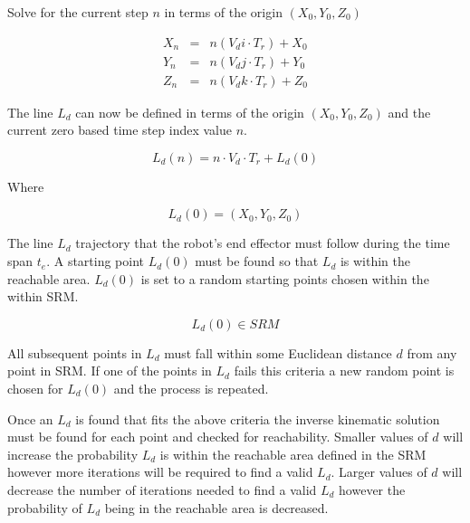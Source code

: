 Solve for the current step $n$ in terms of the origin $(X_0, Y_0, Z_0)$

\begin{eqnarray} 
X_n & = & n(V_di \cdot T_r) + X_0  \\
Y_n & = & n(V_dj \cdot T_r) + Y_0  \\
Z_n & = & n(V_dk \cdot T_r) + Z_0  
\end{eqnarray}

The line $L_d$ can now be defined in terms of the origin $(X_0, Y_0, Z_0)$ and the current zero based time step index value $n$.

\begin{equation}
L_d(n) = n \cdot V_d \cdot T_r + L_d(0)
\end{equation}


Where 

\begin{equation}
L_d(0) = (X_0, Y_0, Z_0)
\end{equation}



The line $L_d$ trajectory that the robot's end effector must follow during the time span $t_e$.  A starting point $L_d(0)$ must be found so that $L_d$ is within the reachable area.  $L_d(0)$ is set to a random starting points chosen within the within SRM.  

\begin{equation}
L_d(0) \in SRM
\end{equation}

All subsequent points in $L_d$ must fall within some Euclidean distance $d$ from any point in SRM.  If one of the points in $L_d$ fails this criteria a new random point is chosen for $L_d(0)$ and the process is repeated. 

Once an $L_d$ is found that fits the above criteria the inverse kinematic solution must be found for each point and checked for reachability.  Smaller values of $d$ will increase the probability $L_d$ is within the reachable area defined in the SRM however more iterations will be required to find a valid $L_d$.  Larger values of $d$ will decrease the number of iterations needed to find a valid $L_d$ however the probability of $L_d$ being in the reachable area is decreased.

